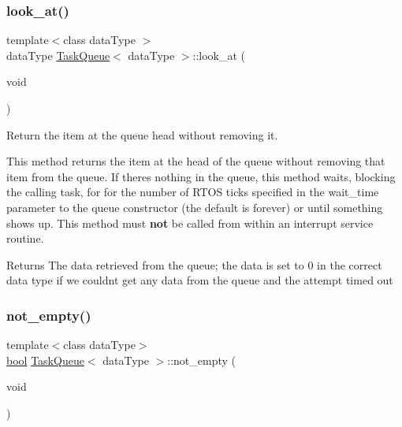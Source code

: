 \subsubsection{\texorpdfstring{look\+\_\+at()}{look\_at()}}
{\footnotesize\ttfamily template$<$class data\+Type $>$ \\
data\+Type \mbox{\hyperlink{class_task_queue}{Task\+Queue}}$<$ data\+Type $>$\+::look\+\_\+at (\begin{DoxyParamCaption}\item[{void}]{ }\end{DoxyParamCaption})\hspace{0.3cm}{\ttfamily [inline]}}



Return the item at the queue head without removing it. 

This method returns the item at the head of the queue without removing that item from the queue. If there\textquotesingle{}s nothing in the queue, this method waits, blocking the calling task, for for the number of R\+T\+OS ticks specified in the {\ttfamily wait\+\_\+time} parameter to the queue constructor (the default is forever) or until something shows up. This method must {\bfseries not} be called from within an interrupt service routine. \begin{DoxyReturn}{Returns}
The data retrieved from the queue; the data is set to 0 in the correct data type if we couldn\textquotesingle{}t get any data from the queue and the attempt timed out 
\end{DoxyReturn}
\mbox{\label{class_task_queue_a0c24c84baac830cce4d6f528a0eee23c}} 
\subsubsection{\texorpdfstring{not\+\_\+empty()}{not\_empty()}}
{\footnotesize\ttfamily template$<$class data\+Type$>$ \\
\mbox{\hyperlink{group___motor___boolean___type_ga0ecf26b576b9a54eca656b9be7ba6a06}{bool}} \mbox{\hyperlink{class_task_queue}{Task\+Queue}}$<$ data\+Type $>$\+::not\+\_\+empty (\begin{DoxyParamCaption}\item[{void}]{ }\end{DoxyParamCaption})\hspace{0.3cm}{\ttfamily [inline]}}



